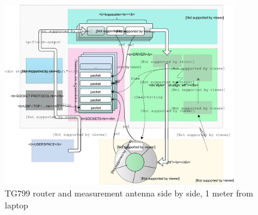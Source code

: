 \begin{figure}
\center
\includegraphics[width=0.9\textwidth]{images/linux-egress-overview.eps}
\caption{TG799 router and measurement antenna side by side, 1 meter from laptop}
\label{fig:linux_egress}
\end{figure}
